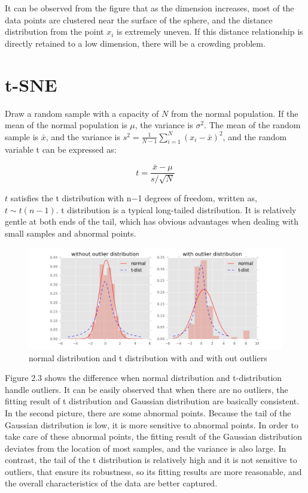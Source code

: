\noindent It can be observed from the figure that as the dimension increases, most of the data points are clustered near the surface of the sphere, and the distance distribution from the point $x_i$ is extremely uneven. If this distance relationship is directly retained to a low dimension, there will be a crowding problem.

\section{t-SNE}
Draw a random sample with a capacity of $N$ from the normal population. If the mean of the normal population is $μ$, the variance is $\sigma^2$. The mean of the random sample is $\bar{x}$, and the variance is $s^2=  \frac {1}{N−1} \sum ^N_{i=1} (x_i−\bar{x})^2$, and the random variable t can be expressed as:

\begin{equation*}
    {t} =  \frac {\bar{x} - \mu}{s / \sqrt{N}} 
\end{equation*}

\noindent $t$ satisfies the t distribution with n−1 degrees of freedom, written as, $t∼t(n−1)$. t distribution is a typical long-tailed distribution. It is relatively gentle at both ends of the tail, which has obvious advantages when dealing with small samples and abnormal points.\\

\begin{figure}[ht]

\centering
\includegraphics[scale=0.6]{images/image_t-distribution.png}
\caption{normal distribution and t distribution with and with out outliers}
\label{fig:label}
\end{figure}

\noindent Figure 2.3 shows the difference when normal distribution and t-distribution handle outliers. It can be easily observed that when there are no outliers, the fitting result of t distribution and Gaussian distribution are basically consistent. In the second picture, there are some abnormal points. Because the tail of the Gaussian distribution is low, it is more sensitive to abnormal points. In order to take care of these abnormal points, the fitting result of the Gaussian distribution deviates from the location of most samples, and the variance is also large. In contrast, the tail of the t distribution is relatively high and it is not sensitive to outliers, that ensure its robustness, so its fitting results are more reasonable, and the overall characteristics of the data are better captured.\\

